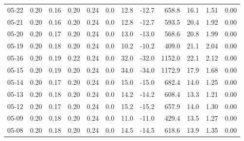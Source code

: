 \begin{threeparttable}
{\begin{tabular}{lrrrrrrrrrrr}
  05-22 &          0.20 &          0.16 &          0.20 &        0.24 &                 0.0 &                12.8 &      -12.7 &               658.8 &             16.1 &            1.51 &                   0.00 \\
  05-21 &          0.20 &          0.16 &          0.20 &        0.24 &                 0.0 &                12.8 &      -12.7 &               593.5 &             20.4 &            1.92 &                   0.00 \\
  05-20 &          0.20 &          0.17 &          0.20 &        0.24 &                 0.0 &                13.0 &      -13.0 &               568.6 &             20.8 &            1.99 &                   0.00 \\
  05-19 &          0.20 &          0.18 &          0.20 &        0.24 &                 0.0 &                10.2 &      -10.2 &               409.0 &             21.1 &            2.04 &                   0.00 \\
  05-16 &          0.20 &          0.19 &          0.22 &        0.24 &                 0.0 &                32.0 &      -32.0 &              1152.0 &             22.1 &            2.12 &                   0.00 \\
  05-15 &          0.20 &          0.19 &          0.20 &        0.24 &                 0.0 &                34.0 &      -34.0 &              1172.9 &             17.9 &            1.68 &                   0.00 \\
  05-14 &          0.20 &          0.17 &          0.20 &        0.24 &                 0.0 &                15.0 &      -15.0 &               682.4 &             14.0 &            1.25 &                   0.00 \\
  05-13 &          0.20 &          0.18 &          0.20 &        0.24 &                 0.0 &                14.2 &      -14.2 &               608.4 &             13.3 &            1.21 &                   0.00 \\
  05-12 &          0.20 &          0.17 &          0.20 &        0.24 &                 0.0 &                15.2 &      -15.2 &               657.9 &             14.0 &            1.30 &                   0.00 \\
  05-09 &          0.20 &          0.18 &          0.20 &        0.24 &                 0.0 &                11.0 &      -11.0 &               429.4 &             13.5 &            1.27 &                   0.00 \\
  05-08 &          0.20 &          0.18 &          0.20 &        0.24 &                 0.0 &                14.5 &      -14.5 &               618.6 &             13.9 &            1.35 &                   0.00 \\

\end{tabular}}
\end{threeparttable}
